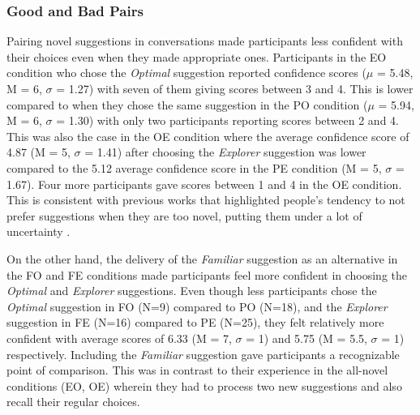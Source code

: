 \subsubsection{Good and Bad Pairs}
Pairing novel suggestions in conversations made participants less confident with their choices even when they made appropriate ones. Participants in the EO condition who chose the \textit{Optimal} suggestion reported confidence scores ($\mu$ =  5.48, M = 6, $\sigma$ = 1.27) with seven of them giving scores between 3 and 4. This  is lower compared to when they chose the same suggestion in the PO condition ($\mu$ =  5.94, M = 6, $\sigma$ = 1.30) with only two participants reporting scores between 2 and 4. This was also the case in the OE condition where the average confidence score of 4.87 (M = 5, $\sigma$ = 1.41) after choosing the \textit{Explorer} suggestion was lower compared to the 5.12 average confidence score in the PE condition (M = 5, $\sigma$ = 1.67). Four more participants gave scores between 1 and 4 in the OE condition. This is consistent with previous works that highlighted people's tendency to not prefer suggestions when they are too novel, putting them under a lot of uncertainty \cite{Ekstrand2014UserAlgorithms}. 

On the other hand, the delivery of the \textit{Familiar} suggestion as an alternative in the FO and FE conditions made participants feel more confident in choosing the \textit{Optimal} and \textit{Explorer} suggestions. Even though less participants chose the \textit{Optimal} suggestion in FO (N=9) compared to PO (N=18), and the \textit{Explorer} suggestion in FE (N=16) compared to PE (N=25), they felt relatively more confident with average scores of 6.33 (M = 7, $\sigma$ = 1) and 5.75 (M = 5.5, $\sigma$ = 1) respectively. Including the \textit{Familiar} suggestion gave participants a recognizable point of comparison. This was in contrast to their experience in the all-novel conditions (EO, OE) wherein they had to process two new suggestions and also recall their regular choices.


